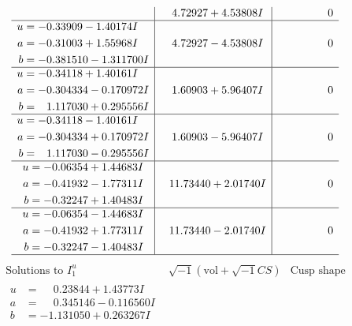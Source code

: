 \documentclass[1p]{elsarticle_modified}
\theoremstyle{definition}
\newcommand{\I}{\sqrt{-1}}
\begin{document}
$$\begin{array}{c|c|c}
 & \phantom{-}4.72927 + 4.53808 I & \phantom{-0.000000 } 0 \\ \hline\begin{aligned}
u &= -0.33909 - 1.40174 I \\
a &= -0.31003 + 1.55968 I \\
b &= -0.381510 - 1.311700 I\end{aligned}
 & \phantom{-}4.72927 - 4.53808 I & \phantom{-0.000000 } 0 \\ \hline\begin{aligned}
u &= -0.34118 + 1.40161 I \\
a &= -0.304334 - 0.170972 I \\
b &= \phantom{-}1.117030 + 0.295556 I\end{aligned}
 & \phantom{-}1.60903 + 5.96407 I & \phantom{-0.000000 } 0 \\ \hline\begin{aligned}
u &= -0.34118 - 1.40161 I \\
a &= -0.304334 + 0.170972 I \\
b &= \phantom{-}1.117030 - 0.295556 I\end{aligned}
 & \phantom{-}1.60903 - 5.96407 I & \phantom{-0.000000 } 0 \\ \hline\begin{aligned}
u &= -0.06354 + 1.44683 I \\
a &= -0.41932 - 1.77311 I \\
b &= -0.32247 + 1.40483 I\end{aligned}
 & \phantom{-}11.73440 + 2.01740 I & \phantom{-0.000000 } 0 \\ \hline\begin{aligned}
u &= -0.06354 - 1.44683 I \\
a &= -0.41932 + 1.77311 I \\
b &= -0.32247 - 1.40483 I\end{aligned}
 & \phantom{-}11.73440 - 2.01740 I & \phantom{-0.000000 } 0\\
 \hline 
 \end{array}$$\newpage$$\begin{array}{c|c|c}  
\text{Solutions to }I^u_{1}& \I (\text{vol} + \sqrt{-1}CS) & \text{Cusp shape}\\
 \hline 
\begin{aligned}
u &= \phantom{-}0.23844 + 1.43773 I \\
a &= \phantom{-}0.345146 - 0.116560 I \\
b &= -1.131050 + 0.263267 I\end{aligned}

\end{array}$$
\end{document}
